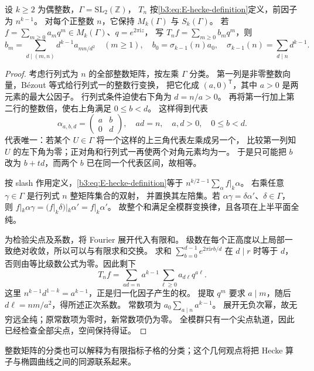 \begin{proposition}[保持模性与系数公式]\label{b3:prop:E-hecke-coefficients}
设 \(k\ge2\) 为偶整数，\(\Gamma=\mathrm{SL}_2(\mathbb Z)\)，
\(T_n\) 按\eqref{b3:eq:E-hecke-definition}定义，前因子为 \(n^{k-1}\)。
对每个正整数 \(n\)，它保持 \(M_k(\Gamma)\) 与 \(S_k(\Gamma)\)。
若 \(f=\sum_{m\ge0}a_mq^m\in M_k(\Gamma)\)、\(q=e^{2\pi\mathrm i z}\)，
写 \(T_nf=\sum_{m\ge0}b_mq^m\)，则
\[
 b_m=\sum_{d\mid(m,n)}d^{k-1}a_{mn/d^2}\quad(m\ge1),
 \quad b_0=\sigma_{k-1}(n)a_0,
 \quad \sigma_{k-1}(n)=\sum_{d\mid n}d^{k-1}.
\]
\end{proposition}
\begin{proof}
考虑行列式为 \(n\) 的全部整数矩阵，按左乘 \(\Gamma\) 分类。
第一列是非零整数向量，Bézout 等式给行列式一的整数行变换，
把它化成 \((a,0)^{\mathsf T}\)，其中 \(a>0\) 是两元素的最大公因子。
行列式条件迫使右下角为 \(d=n/a>0\)。
再将第一行加上第二行的整数倍，使右上角满足 \(0\le b<d\)。
这样得到代表
\[
 \alpha_{a,b,d}=\begin{pmatrix}a&b\\0&d\end{pmatrix},
 \quad ad=n,\quad a,d>0,\quad0\le b<d.
\]
代表唯一：若某个 \(U\in\Gamma\) 将一个这样的上三角代表左乘成另一个，
比较第一列知 \(U\) 的左下角为零；正对角和行列式一再使两个对角元素均为一。
于是只可能把 \(b\) 改为 \(b+td\)，而两个 \(b\) 已在同一个代表区间，故相等。

按 slash 作用定义，\eqref{b3:eq:E-hecke-definition}等于
\(n^{k/2-1}\sum_{\alpha}f|_k\alpha\)。
右乘任意 \(\gamma\in\Gamma\) 是行列式 \(n\) 整矩阵集合的双射，
并置换其左陪集。若 \(\alpha\gamma=\delta\alpha'\)、\(\delta\in\Gamma\)，
则 \(f|_k\alpha\gamma=(f|_k\delta)|_k\alpha'=f|_k\alpha'\)。
故整个和满足全模群变换律，且各项在上半平面全纯。

为检验尖点及系数，将 Fourier 展开代入有限和。
级数在每个正高度以上局部一致绝对收敛，所以可以与有限求和交换。
求和 \(\sum_{b=0}^{d-1}e^{2\pi\mathrm i rb/d}\) 在 \(d\mid r\) 时等于 \(d\)，
否则由等比级数公式为零。因此剩下
\[
 T_nf=\sum_{ad=n}a^{k-1}\sum_{\ell\ge0}a_{d\ell}q^{a\ell}.
\]
这里 \(n^{k-1}d^{1-k}=a^{k-1}\)，正是归一化因子产生的权。
提取 \(q^m\) 要求 \(a\mid m\)，随后 \(d\ell=nm/a^2\)，得所述正次系数。
常数项为 \(a_0\sum_{a\mid n}a^{k-1}\)。
展开无负次幂，故无穷远全纯；原常数项为零时，新常数项仍为零。
全模群只有一个尖点轨道，因此已经检查全部尖点，空间保持得证。
\end{proof}
整数矩阵的分类也可以解释为有限指标子格的分类；这个几何观点将把 Hecke 算子与椭圆曲线之间的同源联系起来。

